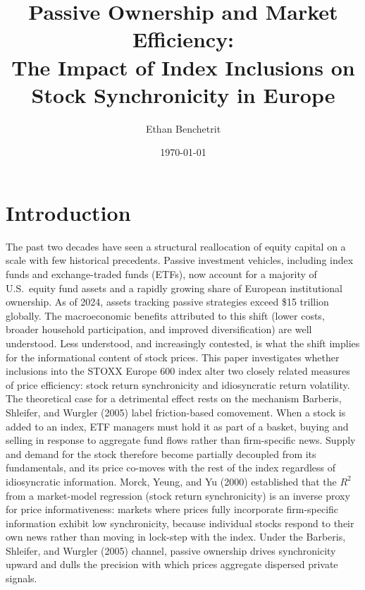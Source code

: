 \documentclass[12pt, a4paper]{article}
\title{\textbf{Passive Ownership and Market Efficiency:} \\ \large The Impact of Index Inclusions on Stock Synchronicity in Europe}
\author{Ethan Benchetrit}
\date{\today}
\begin{document}
\maketitle
\onehalfspacing

\section{Introduction}

The past two decades have seen a structural reallocation of equity capital on a scale with few historical precedents. Passive investment vehicles, including index funds and exchange-traded funds (ETFs), now account for a majority of U.S.\ equity fund assets and a rapidly growing share of European institutional ownership. As of 2024, assets tracking passive strategies exceed \$15 trillion globally. The macroeconomic benefits attributed to this shift (lower costs, broader household participation, and improved diversification) are well understood. Less understood, and increasingly contested, is what the shift implies for the informational content of stock prices. This paper investigates whether inclusions into the STOXX Europe 600 index alter two closely related measures of price efficiency: stock return synchronicity and idiosyncratic return volatility.\\

The theoretical case for a detrimental effect rests on the mechanism Barberis, Shleifer, and Wurgler (2005) label friction-based comovement. When a stock is added to an index, ETF managers must hold it as part of a basket, buying and selling in response to aggregate fund flows rather than firm-specific news. Supply and demand for the stock therefore become partially decoupled from its fundamentals, and its price co-moves with the rest of the index regardless of idiosyncratic information. Morck, Yeung, and Yu (2000) established that the $R^2$ from a market-model regression (stock return synchronicity) is an inverse proxy for price informativeness: markets where prices fully incorporate firm-specific information exhibit low synchronicity, because individual stocks respond to their own news rather than moving in lock-step with the index. Under the Barberis, Shleifer, and Wurgler (2005) channel, passive ownership drives synchronicity upward and dulls the precision with which prices aggregate dispersed private signals.\\
\end{document}

